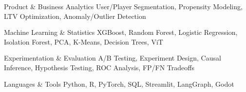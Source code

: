 

\begin{cvskills}

  \cvskill
    {Product \& Business Analytics}
    {User/Player Segmentation, Propensity Modeling, LTV Optimization, Anomaly/Outlier Detection}

  \cvskill
    {Machine Learning \& Statistics}
    {XGBoost, Random Forest, Logistic Regression, Isolation Forest, PCA, K-Means, Decision Trees, ViT}

  \cvskill
    {Experimentation \& Evaluation}
    {A/B Testing, Experiment Design, Causal Inference, Hypothesis Testing, ROC Analysis, FP/FN Tradeoffs}

  \cvskill
    {Languages \& Tools}
    {Python, R, PyTorch, SQL, Streamlit, LangGraph, Godot}

\end{cvskills}
